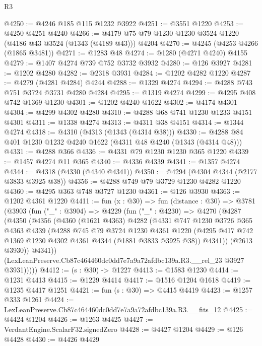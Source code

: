 \begin{lexlean}{R3}
\begin{coremodule}
@4250 := @4246 @185 @115 @1232 @3922
@4251 := @3551 @1220
@4253 := @4250 @4251 @4240
@4266 := @4179 @75 @79 @1230 @1230 @3524 @1220 (@4186 @43 @3524 (@1343 (@4189 @43))) @4204
@4270 := @4245 (@4253 @4266 (@1865 @3481))
@4271 := @1283 @48
@4274 := @1280 (@4271 @4240) @4155
@4279 := @1407 @4274 @739 @752 @3732 @3932
@4280 := @126 @3927
@4281 := @1202 @4280
@4282 := @2318 @3931
@4284 := @1202 @4282 @1220
@4287 := @4279 (@4281 @4284) @4244
@4288 := @1329 @4274
@4294 := @4288 @743 @751 @3724 @3731 @4280 @4284
@4295 := @1319 @4274
@4299 := @4295 @408 @742 @1369 @1230
@4301 := @1202 @4240 @1622
@4302 := @4174 @4301
@4304 := @4299 @4302 @4280
@4310 := @4288 @68 @741 @1230 @1233 @4151 @4301
@4311 := @1338 @4274
@4313 := @4311 @38 @4151
@4314 := @1344 @4274
@4318 := @4310 (@4313 (@1343 (@4314 @38)))
@4330 := @4288 @84 @401 @1230 @1232 @4240 @1622 (@4311 @48 @4240 (@1343 (@4314 @48)))
@4331 := @4288 @366
@4336 := @4331 @79 @1230 @1230 @365 @1220
@4339 := @1457 @4274 @11 @365
@4340 := @4336 @4339
@4341 := @1357 @4274
@4344 := @4318 (@4330 (@4340 @4341))
@4350 := @4294 (@4304 @4344 (@2177 @3833 @3925 @38))
@4356 := @4288 @749 @79 @3729 @1230 @4282 @1220
@4360 := @4295 @363 @748 @3727 @1230
@4361 := @126 @3930
@4363 := @1202 @4361 @1220
@4411 := fun (x : @30) =>
  fun (distance : @30) =>
  @3781
    (@3903
      (fun ("_" : @3904) =>
      @4229
        (fun ("_" : @4230) =>
        @4270
          (@4287
            (@4350
              (@4356
                (@4360
                  (@1621 @4363)
                  @4282
                  (@4331
                    @747
                    @1230
                    @3726
                    @365
                    @4363
                    @4339
                    (@4288
                      @745
                      @79
                      @3724
                      @1230
                      @4361
                      @1220
                      (@4295 @417 @742 @1369 @1230 @4302 @4361 @4344 (@1881 @3833 @3925 @38))
                      @4341))
                  (@2613 @3930))
                @4341))
            (LexLeanPreserve.Cb87c464460dc0dd7e7a9a72afdbc139a.R3.__rel_23 @3927 @3931)))))
@4412 := (s : @30) -> @1227
@4413 := @1583 @1230
@4414 := @1231 @4413
@4415 := @1229 @4414
@4417 := @1516 @1204 @1618
@4419 := @1235 @4417 @1251
@4421 := fun (s : @30) => @4415 @4419
@4423 := @1257 @333 @1261
@4424 := LexLeanPreserve.Cb87c464460dc0dd7e7a9a72afdbc139a.R3.__fits_12
@4425 := @4424 @1204
@4426 := @1263 @4425
@4427 := VerdantEngine.ScalarF32.signedZero
@4428 := @4427 @1204
@4429 := @126 @4428
@4430 := @4426 @4429

\end{coremodule}
\end{lexlean}
